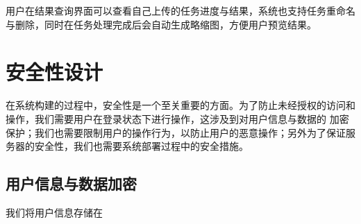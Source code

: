用户在结果查询界面可以查看自己上传的任务进度与结果，系统也支持任务重命名与删除，同时在任务处理完成后会自动生成略缩图，方便用户预览结果。

\section{安全性设计}

在系统构建的过程中，安全性是一个至关重要的方面。为了防止未经授权的访问和操作，我们需要用户在登录状态下进行操作，这涉及到对用户信息与数据的
加密保护；我们也需要限制用户的操作行为，以防止用户的恶意操作；另外为了保证服务器的安全性，我们也需要系统部署过程中的安全措施。

\subsection{用户信息与数据加密}

我们将用户信息存储在


